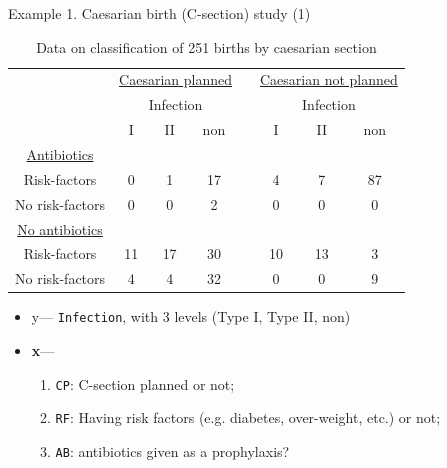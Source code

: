 \documentclass{beamer}
\newcommand{\boldx}{{\bf x}}
\begin{document}
\begin{frame}{Example 1. Caesarian birth  (C-section) study (1)}
\begin{table} [!htbp]
\caption{Data on classification of 251 births by caesarian section \label{tab1.1}}
\begin{center}
\begin{tabular}{|c|ccccccc|}
\hline
 &\multicolumn{3}{c}{\underline{Caesarian planned}} & & \multicolumn{3}{c|}{\underline{Caesarian not planned}} \\ 
& \multicolumn{3}{c}{Infection} & & \multicolumn{3}{c|}{Infection} \\
& I & II & non & &  I & II & non \\ \hline
\underline{Antibiotics} & & & & & & & \\ 
Risk-factors & 0 & 1 & 17 & &4 &7 & 87 \\
No risk-factors & 0 & 0 & 2 & &0 &0 & 0 \\ \hline
\underline{No antibiotics} & & & & & & & \\ 
Risk-factors & 11 & 17 & 30 & &10 &13 & 3 \\
No risk-factors & 4 & 4 & 32 & &0 &0 & 9 \\ \hline
\end{tabular}
\end{center}
\end{table}
\begin{itemize}
\item
y--- \texttt{Infection}, with 3 levels (Type I, Type II, non)
\item
\boldx ---  \begin{enumerate}
\item
\texttt{CP}: C-section planned or not; 
\item
\texttt{RF}: Having risk factors (e.g. diabetes, over-weight, etc.) or not;
\item
\texttt{AB}: antibiotics given as a prophylaxis? 
\end{enumerate}
\end{itemize}
\end{frame}
\end{document}
